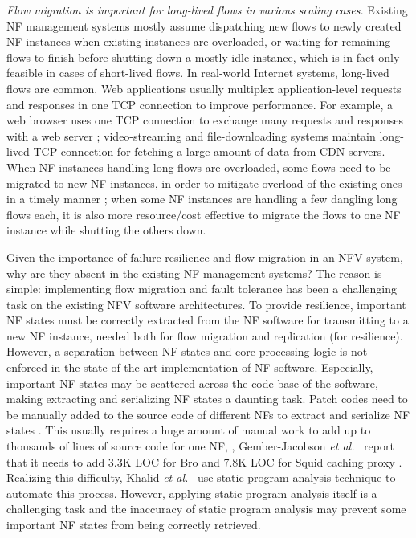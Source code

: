{\em Flow migration is important for long-lived flows in various scaling cases.} Existing NF management systems mostly assume dispatching new flows to newly created NF instances when existing instances are overloaded, or waiting for remaining flows to finish before shutting down a mostly idle instance, which is in fact only feasible in cases of short-lived flows. In real-world Internet systems, long-lived flows are common. Web applications %
 usually multiplex application-level requests and responses in
one TCP connection to improve performance. For example, a web browser uses one TCP connection to exchange many requests and responses with a
web server \cite{http-keep-alive}; video-streaming
\cite{ffmpeg} and file-downloading \cite{ftp} systems maintain long-lived TCP
connection for fetching a large amount of data from CDN servers. %
 When NF instances handling long flows are overloaded, some flows need to be migrated to new NF instances, in order to mitigate overload of the existing ones in a timely manner \cite{gember2015opennf}; when some NF instances are handling a few dangling long flows each, it is also more resource/cost effective to migrate the flows to one NF instance while shutting the others down.


Given the importance of failure resilience and flow migration in an NFV system, why are they absent in the existing NF management systems? The reason is simple: implementing flow migration and fault
tolerance has been a challenging task on the existing NFV software architectures. To provide resilience, important NF states must be correctly extracted from the NF software for transmitting to a new NF instance, needed both for flow migration and replication (for resilience). However, a separation between NF states and core processing logic is not enforced in the state-of-the-art implementation of NF software. Especially, important NF states may be scattered across the code base of the software, making
extracting and serializing NF states a daunting task. Patch codes need to be
manually added to the source code of different NFs to extract and serialize NF
states \cite{gember2015opennf}\cite{rajagopalan2013split}. This usually requires a huge amount of manual work to add up to
thousands of lines of source code for one NF, \eg, Gember-Jacobson {\em et al.}~\cite{gember2015opennf} report
that it needs to add 3.3K LOC for Bro \cite{bro} and 7.8K LOC for Squid caching
proxy \cite{squid}.  Realizing this difficulty, Khalid {\em et al.}~\cite{khalid2016paving} use
static program analysis technique to automate this process. However, applying
static program analysis itself is a challenging task and the inaccuracy of
static program analysis may prevent some important NF states from being
correctly retrieved.

